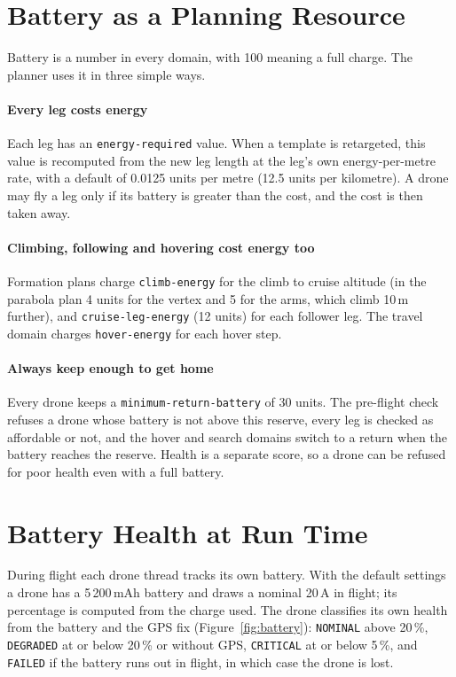\documentclass[11pt,a4paper,oneside]{report}
\newcommand{\code}[1]{\texttt{#1}}
\begin{document}
\section{Battery as a Planning Resource}
Battery is a number in every domain, with 100 meaning a full charge. The planner uses it in three
simple ways.

\paragraph{Every leg costs energy}
Each leg has an \code{energy-required} value. When a template is retargeted, this value is
recomputed from the new leg length at the leg's own energy-per-metre rate, with a default of
0.0125 units per metre (12.5 units per kilometre). A drone may fly a leg only if its battery is
greater than the cost, and the cost is then taken away.

\paragraph{Climbing, following and hovering cost energy too}
Formation plans charge \code{climb-energy} for the climb to cruise altitude (in the parabola
plan 4 units for the vertex and 5 for the arms, which climb 10\,m further), and
\code{cruise-leg-energy} (12 units) for each follower leg. The travel domain charges
\code{hover-energy} for each hover step.

\paragraph{Always keep enough to get home}
Every drone keeps a \code{minimum-return-battery} of 30 units. The pre-flight check refuses a
drone whose battery is not above this reserve, every leg is checked as affordable or not, and the
hover and search domains switch to a return when the battery reaches the reserve. Health is a
separate score, so a drone can be refused for poor health even with a full battery.

\section{Battery Health at Run Time}
During flight each drone thread tracks its own battery. With the default settings a drone has a
5\,200\,mAh battery and draws a nominal 20\,A in flight; its percentage is computed from the
charge used. The drone classifies its own health from the battery and the GPS fix
(Figure~\ref{fig:battery}): \code{NOMINAL} above 20\,\%, \code{DEGRADED} at or below 20\,\% or
without GPS, \code{CRITICAL} at or below 5\,\%, and \code{FAILED} if the battery runs out in
flight, in which case the drone is lost.
\end{document}
